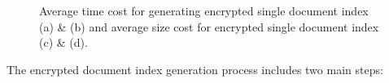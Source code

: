 \documentclass[sigconf,pdftex]{acmart}
\begin{document}
\begin{figure}[htpb]
    \centering
    \hfill
 
    \hfill
  \caption{\small{Average time cost for generating encrypted single document index (a) \& (b) and average size cost for encrypted single document index (c) \& (d).}}
  \label{fig:avgSizeEncryption} 
\end{figure}



The encrypted document index generation process includes two main steps: 
\end{document}

